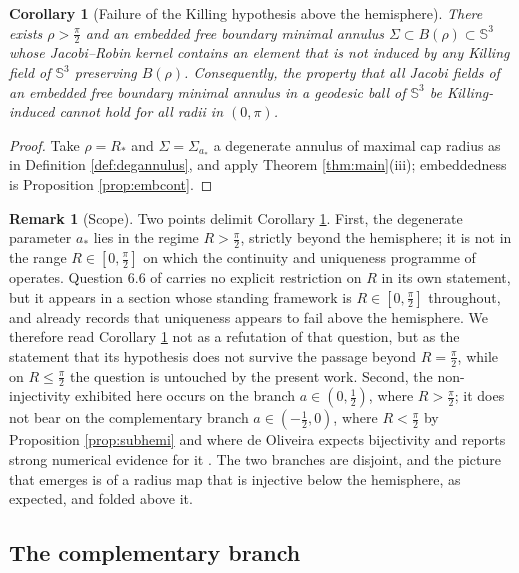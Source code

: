 \documentclass[11pt,a4paper]{amsart}
\theoremstyle{plain}
\newtheorem{corollary}[theorem]{Corollary}
\theoremstyle{definition}
\newtheorem{remark}[theorem]{Remark}
\newcommand{\Sph}{\mathbb{S}}
\begin{document}
\begin{corollary}[Failure of the Killing hypothesis above the hemisphere]\label{cor:Q66}
There exists $\rho>\tfrac\pi2$ and an embedded free boundary minimal annulus $\Sigma\subset B(\rho)\subset\Sph^3$ whose Jacobi--Robin kernel contains an element that is not induced by any Killing field of $\Sph^3$ preserving $B(\rho)$. Consequently, the property that all Jacobi fields of an embedded free boundary minimal annulus in a geodesic ball of $\Sph^3$ be Killing-induced cannot hold for all radii in $(0,\pi)$.
\end{corollary}

\begin{proof}
Take $\rho=R_*$ and $\Sigma=\Sigma_{a_*}$ a degenerate annulus of maximal cap radius as in Definition \ref{def:degannulus}, and apply Theorem \ref{thm:main}(iii); embeddedness is Proposition \ref{prop:embcont}.
\end{proof}

\begin{remark}[Scope]\label{rem:scope}
Two points delimit Corollary \ref{cor:Q66}. First, the degenerate parameter $a_*$ lies in the regime $R>\tfrac\pi2$, strictly beyond the hemisphere; it is not in the range $R\in[0,\tfrac\pi2]$ on which the continuity and uniqueness programme of \cite[\S 6]{NZ1} operates. Question 6.6 of \cite{NZ1} carries no explicit restriction on $R$ in its own statement, but it appears in a section whose standing framework is $R\in[0,\tfrac\pi2]$ throughout, and \cite[Rem. 1.3]{NZ1} already records that uniqueness appears to fail above the hemisphere. We therefore read Corollary \ref{cor:Q66} not as a refutation of that question, but as the statement that its hypothesis does not survive the passage beyond $R=\tfrac\pi2$, while on $R\leq\tfrac\pi2$ the question is untouched by the present work. Second, the non-injectivity exhibited here occurs on the branch $a\in(0,\tfrac12)$, where $R>\tfrac\pi2$; it does not bear on the complementary branch $a\in(-\tfrac12,0)$, where $R<\tfrac\pi2$ by Proposition \ref{prop:subhemi} and where de Oliveira expects bijectivity and reports strong numerical evidence for it \cite[Rem. 3.5]{dO24}. The two branches are disjoint, and the picture that emerges is of a radius map that is injective below the hemisphere, as expected, and folded above it.
\end{remark}

\subsection*{The complementary branch}
\end{document}
